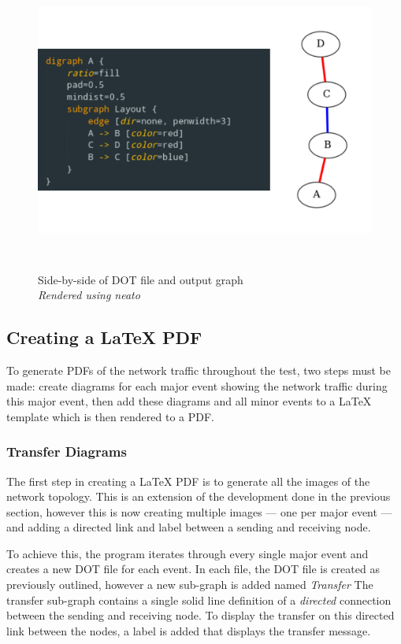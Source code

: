 \begin{figure}
    \begin{centering}
        \includegraphics[width=15cm,height=10cm,keepaspectratio]{Figures/Chapter5-DotAndRender.png}
        \caption{Side-by-side of DOT file and output graph\\ \emph{Rendered using neato}}
        \label{fig:chapter5DotAndRender}
    \end{centering}
\end{figure}

\subsection{Creating a LaTeX PDF}
To generate PDFs of the network traffic throughout the test, two steps must be made: create diagrams for each major event showing the network traffic during this major event, then add these diagrams and all minor events to a LaTeX template which is then rendered to a PDF.

\subsubsection{Transfer Diagrams}
The first step in creating a LaTeX PDF is to generate all the images of the network topology.
This is an extension of the development done in the previous section, however this is now creating multiple images — one per major event — and adding a directed link and label between a sending and receiving node.

To achieve this, the program iterates through every single major event and creates a new DOT file for each event.
In each file, the DOT file is created as previously outlined, however a new sub-graph is added named \emph{Transfer}
The transfer sub-graph contains a single solid line definition of a \emph{directed} connection between the sending and receiving node.
To display the transfer on this directed link between the nodes, a label is added that displays the transfer message.

